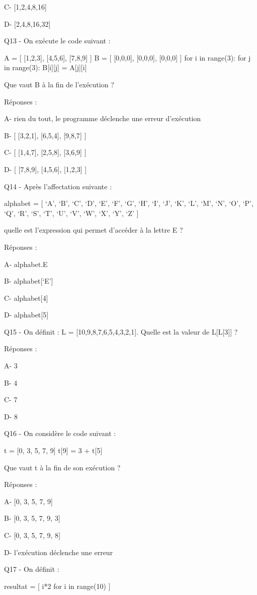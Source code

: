 \documentclass[
]{book}
\begin{document}
C- {[}1,2,4,8,16{]}

D- {[}2,4,8,16,32{]}

Q13 - On exécute le code suivant :

A = {[} {[}1,2,3{]}, {[}4,5,6{]}, {[}7,8,9{]} {]}
B = {[} {[}0,0,0{]}, {[}0,0,0{]}, {[}0,0,0{]} {]}
for i in range(3):
for j in range(3):
B{[}i{]}{[}j{]} = A{[}j{]}{[}i{]}

Que vaut B à la fin de l'exécution ?

Réponses :

A- rien du tout, le programme déclenche une erreur d'exécution

B- {[} {[}3,2,1{]}, {[}6,5,4{]}, {[}9,8,7{]} {]}

C- {[} {[}1,4,7{]}, {[}2,5,8{]}, {[}3,6,9{]} {]}

D- {[} {[}7,8,9{]}, {[}4,5,6{]}, {[}1,2,3{]} {]}

Q14 - Après l'affectation suivante :

alphabet = {[} `A', `B', `C', `D', `E', `F', `G', `H', `I', `J', `K', `L', `M', `N', `O', `P', `Q', `R', `S', `T', `U', `V', `W', `X', `Y', `Z' {]}

quelle est l'expression qui permet d'accéder à la lettre E ?

Réponses :

A- alphabet.E

B- alphabet{[}`E'{]}

C- alphabet{[}4{]}

D- alphabet{[}5{]}

Q15 - On définit : L = {[}10,9,8,7,6,5,4,3,2,1{]}. Quelle est la valeur de L{[}L{[}3{]}{]} ?

Réponses :

A- 3

B- 4

C- 7

D- 8

Q16 - On considère le code suivant :

t = {[}0, 3, 5, 7, 9{]}
t{[}9{]} = 3 + t{[}5{]}

Que vaut t à la fin de son exécution ?

Réponses :

A- {[}0, 3, 5, 7, 9{]}

B- {[}0, 3, 5, 7, 9, 3{]}

C- {[}0, 3, 5, 7, 9, 8{]}

D- l'exécution déclenche une erreur

Q17 - On définit :

resultat = {[} i*2 for i in range(10) {]}
\end{document}

